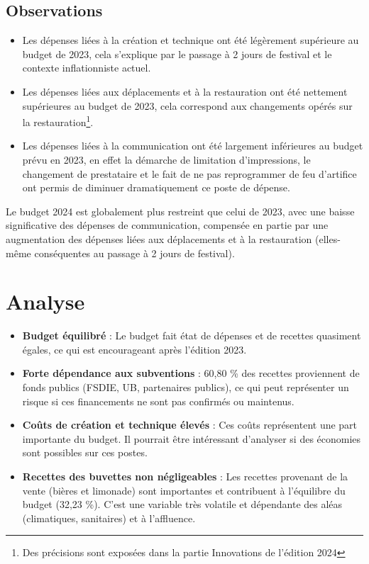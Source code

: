 \documentclass[12pt,a4paper]{report}
\begin{document}
\subsection{Observations}
\begin{itemize}
\item Les dépenses liées à la création et technique ont été légèrement supérieure au budget de 2023, cela s'explique par le passage à 2 jours de festival et le contexte inflationniste actuel.
\item Les dépenses liées aux déplacements et à la restauration ont été nettement supérieures au budget de 2023, cela correspond aux changements opérés sur la restauration\footnote{Des précisions sont exposées dans la partie \og Innovations de l'édition 2024 \fg{}}.
\item Les dépenses liées à la communication ont été largement inférieures au budget prévu en 2023, en effet la démarche de limitation d'impressions, le changement de prestataire et le fait de ne pas reprogrammer de feu d'artifice ont permis de diminuer dramatiquement ce poste de dépense.\\
\end{itemize}

Le budget 2024 est globalement plus restreint que celui de 2023, avec une baisse significative des dépenses de communication, compensée en partie par une augmentation des dépenses liées aux déplacements et à la restauration (elles-même conséquentes au passage à 2 jours de festival).

\section{Analyse}
\begin{itemize}
\item \textbf{Budget équilibré} : Le budget fait état de dépenses et de recettes quasiment égales, ce qui est encourageant après l'édition 2023.
\item \textbf{Forte dépendance aux subventions} : 60,80 \% des recettes proviennent de fonds publics (FSDIE, UB, partenaires publics), ce qui peut représenter un risque si ces financements ne sont pas confirmés ou maintenus.
\item \textbf{Coûts de création et technique élevés} : Ces coûts représentent une part importante du budget. Il pourrait être intéressant d'analyser si des économies sont possibles sur ces postes.
\item \textbf{Recettes des buvettes non négligeables} : Les recettes provenant de la vente (bières et limonade) sont importantes et contribuent à l'équilibre du budget (32,23 \%). C'est une variable très volatile et dépendante des aléas (climatiques, sanitaires) et à l'affluence.
\end{itemize}
\end{document}
